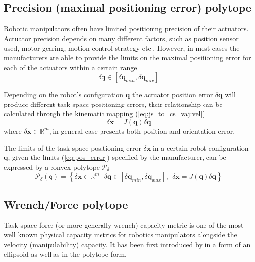 \subsection{Precision (maximal positioning error) polytope }

Robotic manipulators often have limited positioning precision of their actuators. Actuator precision depends on many different factors, such as position sensor used, motor gearing, motion control strategy etc \cite{pholsiri2005real,Finotello1998}. However, in most cases the manufacturers are able to provide the limits on the maximal positioning error for each of the actuators within a certain range
\begin{equation}
    \delta\bm{q} \in [\delta\bm{q}_{min}, \delta\bm{q}_{min}]
    \label{eq:pos_error}
\end{equation}

Depending on the robot's configuration $\bm{q}$ the actuator position error $\delta\bm{q}$ will produce different task space positioning errors, their relationship can be calculated through the kinematic mapping (\ref{eq:js_to_cs_vaj:vel})
\begin{equation}
    \delta\bm{x} = J(\bm{q})\delta \bm{q}
\end{equation}
where $\delta\bm{x}\in\mathbb{R}^m$, in general case presents both position and orientation error.

The limits of the task space positioning error $\delta \bm{x}$ in a certain robot configuration $\bm{q}$, given the limits (\ref{eq:pos_error}) specified by the manufacturer, can be expressed by a convex polytope $\mathcal{P}_\delta$
\begin{equation}
    \mathcal{P}_\delta(\bm{q}) = \left\{ \delta \bm{x} \in \mathbb{R}^m ~|~ \delta  {\bm{q}}\in\left[ \delta {\bm{q}}_{min}, \delta {\bm{q}}_{max} \right], ~~  \delta  {\bm{x}} = J(\bm{q}) \delta {\bm{q}} \right\}
    \label{eq:poly_precision_rob}
\end{equation}

\subsection{Wrench/Force polytope}
\label{ch:poly_force}
Task space force (or more generally wrench) capacity metric is one of the most well known physical capacity metrics for robotics manipulators alongside the velocity (manipulability) capacity. It has been first introduced by \citet{chiacchio_evaluation_1996} in a form of an ellipsoid as well as in the polytope form.

